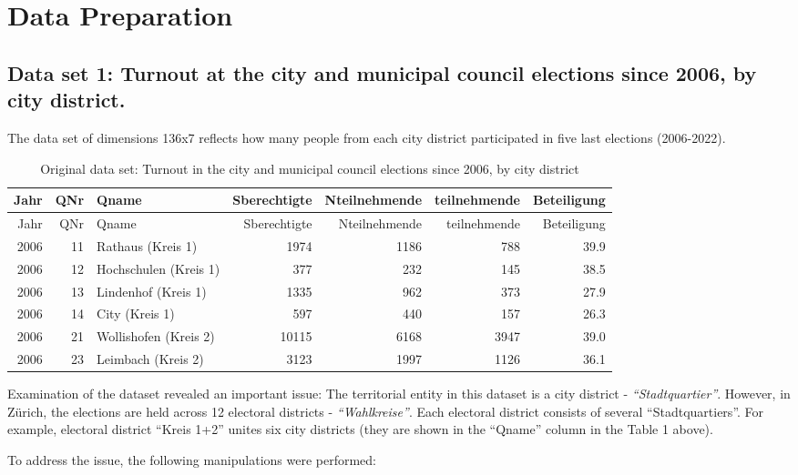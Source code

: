 \documentclass[
]{article}
\begin{document}
\pagebreak

\hypertarget{data-preparation}{%
\section{Data Preparation}\label{data-preparation}}

\hypertarget{data-set-1-turnout-at-the-city-and-municipal-council-elections-since-2006-by-city-district.}{%
\subsection{Data set 1: Turnout at the city and municipal council
elections since 2006, by city
district.}\label{data-set-1-turnout-at-the-city-and-municipal-council-elections-since-2006-by-city-district.}}

The data set of dimensions 136x7 reflects how many people from each city
district participated in five last elections (2006-2022).

\begin{longtable}[]{@{}rrlrrrr@{}}
\caption{Original data set: Turnout in the city and municipal council
elections since 2006, by city district}\tabularnewline
\toprule
Jahr & QNr & Qname & Sberechtigte & Nteilnehmende & teilnehmende &
Beteiligung\tabularnewline
\midrule
\endfirsthead
\toprule
Jahr & QNr & Qname & Sberechtigte & Nteilnehmende & teilnehmende &
Beteiligung\tabularnewline
\midrule
\endhead
2006 & 11 & Rathaus (Kreis 1) & 1974 & 1186 & 788 & 39.9\tabularnewline
2006 & 12 & Hochschulen (Kreis 1) & 377 & 232 & 145 &
38.5\tabularnewline
2006 & 13 & Lindenhof (Kreis 1) & 1335 & 962 & 373 & 27.9\tabularnewline
2006 & 14 & City (Kreis 1) & 597 & 440 & 157 & 26.3\tabularnewline
2006 & 21 & Wollishofen (Kreis 2) & 10115 & 6168 & 3947 &
39.0\tabularnewline
2006 & 23 & Leimbach (Kreis 2) & 3123 & 1997 & 1126 &
36.1\tabularnewline
\bottomrule
\end{longtable}

Examination of the dataset revealed an important issue: The territorial
entity in this dataset is a city district - \emph{``Stadtquartier''}.
However, in Zürich, the elections are held across 12 electoral districts
- \emph{``Wahlkreise''}. Each electoral district consists of several
``Stadtquartiers''. For example, electoral district ``Kreis 1+2'' unites
six city districts (they are shown in the ``Qname'' column in the Table
1 above).

To address the issue, the following manipulations were performed:
\end{document}
